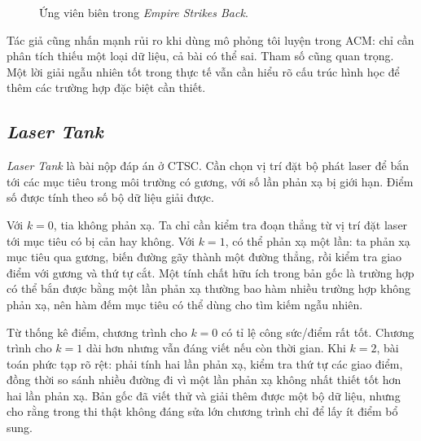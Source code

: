 \documentclass[11pt]{article}
\begin{document}
\begin{figure}[htbp]
\centering
{}
\caption{Ứng viên biên trong \textit{Empire Strikes Back}.}
\end{figure}

Tác giả cũng nhấn mạnh rủi ro khi dùng mô phỏng tôi luyện trong ACM: chỉ cần
phân tích thiếu một loại dữ liệu, cả bài có thể sai. Tham số cũng quan trọng.
Một lời giải ngẫu nhiên tốt trong thực tế vẫn cần hiểu rõ cấu trúc hình học để
thêm các trường hợp đặc biệt cần thiết.

\subsection{\textit{Laser Tank}}

\textit{Laser Tank} là bài nộp đáp án ở CTSC. Cần chọn vị trí đặt bộ phát
laser để bắn tới các mục tiêu trong môi trường có gương, với số lần phản xạ
bị giới hạn. Điểm số được tính theo số bộ dữ liệu giải được.

Với \(k=0\), tia không phản xạ. Ta chỉ cần kiểm tra đoạn thẳng từ vị trí đặt
laser tới mục tiêu có bị cản hay không. Với \(k=1\), có thể phản xạ một lần:
ta phản xạ mục tiêu qua gương, biến đường gãy thành một đường thẳng, rồi kiểm
tra giao điểm với gương và thứ tự cắt. Một tính chất hữu ích trong bản gốc là
trường hợp có thể bắn được bằng một lần phản xạ thường bao hàm nhiều trường
hợp không phản xạ, nên hàm đếm mục tiêu có thể dùng cho tìm kiếm ngẫu nhiên.

Từ thống kê điểm, chương trình cho \(k=0\) có tỉ lệ công sức/điểm rất tốt.
Chương trình cho \(k=1\) dài hơn nhưng vẫn đáng viết nếu còn thời gian. Khi
\(k=2\), bài toán phức tạp rõ rệt: phải tính hai lần phản xạ, kiểm tra thứ tự
các giao điểm, đồng thời so sánh nhiều đường đi vì một lần phản xạ không nhất
thiết tốt hơn hai lần phản xạ. Bản gốc đã viết thử và giải thêm được một bộ
dữ liệu, nhưng cho rằng trong thi thật không đáng sửa lớn chương trình chỉ để
lấy ít điểm bổ sung.
\end{document}
